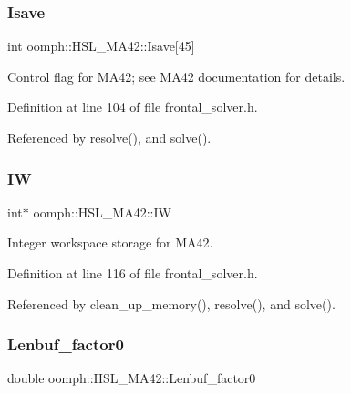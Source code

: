 \subsubsection{\texorpdfstring{Isave}{Isave}}
{\footnotesize\ttfamily int oomph\+::\+H\+S\+L\+\_\+\+M\+A42\+::\+Isave\mbox{[}45\mbox{]}\hspace{0.3cm}{\ttfamily [private]}}



Control flag for M\+A42; see M\+A42 documentation for details. 



Definition at line 104 of file frontal\+\_\+solver.\+h.



Referenced by resolve(), and solve().

\mbox{\label{classoomph_1_1HSL__MA42_aee49355d4011d4867ec6ed92823b4162}} 
\subsubsection{\texorpdfstring{IW}{IW}}
{\footnotesize\ttfamily int$\ast$ oomph\+::\+H\+S\+L\+\_\+\+M\+A42\+::\+IW\hspace{0.3cm}{\ttfamily [private]}}



Integer workspace storage for M\+A42. 



Definition at line 116 of file frontal\+\_\+solver.\+h.



Referenced by clean\+\_\+up\+\_\+memory(), resolve(), and solve().

\mbox{\label{classoomph_1_1HSL__MA42_ad75423bfeb4216b896623f1dd4238d19}} 
\subsubsection{\texorpdfstring{Lenbuf\+\_\+factor0}{Lenbuf\_factor0}}
{\footnotesize\ttfamily double oomph\+::\+H\+S\+L\+\_\+\+M\+A42\+::\+Lenbuf\+\_\+factor0\hspace{0.3cm}{\ttfamily [private]}}



